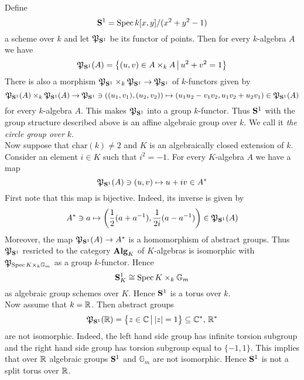 \begin{example}\label{example:non_split_torus}
Define
$$\mathbf{S}^1 = \mathrm{Spec}\, k[x,y]/(x^2+y^2-1)$$
a scheme over $k$ and let ${\mathfrak P}_{\mathbf{S}^1}$ be its functor of points. Then for every $k$-algebra $A$ we have
$${\mathfrak P}_{\mathbf{S}^1}(A) = \big\{(u,v)\in A\times_k A\,\big|\,u^2+v^2=1\big\}$$
There is also a morphism ${\mathfrak P}_{\mathbf{S}^1}\times_k {\mathfrak P}_{\mathbf{S}^1}\rightarrow {\mathfrak P}_{\mathbf{S}^1}$ of $k$-functors given by
$${\mathfrak P}_{\mathbf{S}^1}(A)\times_k {\mathfrak P}_{\mathbf{S}^1}(A)\rightarrow {\mathfrak P}_{\mathbf{S}^1}\ni \left((u_1,v_1),(u_2,v_2)\right)\mapsto (u_1u_2-v_1v_2,u_1v_2+u_2v_1)\in {\mathfrak P}_{\mathbf{S}^1}(A)$$
for every $k$-algebra $A$. This makes ${\mathfrak P}_{\mathbf{S}^1}$ into a group $k$-functor. Thus $\mathbf{S}^1$ with the group structure described above is an affine algebraic group over $k$. We call it \textit{the circle group over $k$}.\\
Now suppose that $\mathrm{char}(k) \neq 2$ and $K$ is an algebraically closed extension of $k$. Consider an element $i\in K$ such that $i^2 = -1$. For every $K$-algebra $A$ we have a map
$${\mathfrak P}_{\mathbf{S}^1}(A)\ni (u,v)\mapsto u+iv\in A^*$$
First note that this map is bijective. Indeed, its inverse is given by
$$A^*\ni a \mapsto \left(\frac{1}{2}(a+a^{-1}),\frac{1}{2i}(a-a^{-1})\right) \in {\mathfrak P}_{\mathbf{S}^1}(A)$$
Moreover, the map ${\mathfrak P}_{\mathbf{S}^1}(A)\rightarrow A^*$ is a homomorphism of abstract groups. Thus ${\mathfrak P}_{\mathbf{S}^1}$ resricted to the category $\mathbf{Alg}_K$ of $K$-algebras is isomorphic with ${\mathfrak P}_{\mathrm{Spec}\, K\times_k \mathbb{G}_{m}}$ as a group $k$-functor. Hence
$$\mathbf{S}^1_K \cong \mathrm{Spec}\, K\times_k \mathbb{G}_{m}$$
as algebraic group schemes over $K$. Hence $\mathbf{S}^1$ is a torus over $k$.\\
Now assume that $k = {\mathbb R}$. Then abstract groups
$${\mathfrak P}_{\mathbf{S}^1}({\mathbb R}) = \big\{z\in {\mathbb C}\,\big|\,|z|=1\big\} \subseteq {\mathbb C}^*,\,{\mathbb R}^*$$
are not isomorphic. Indeed, the left hand side group has infinite torsion subgroup and the right hand side group has torsion subgroup equal to $\{-1,1\}$. This implies that over ${\mathbb R}$ algebraic groups $\mathbf{S}^1$ and $\mathbb{G}_{m}$ are not isomorphic. Hence $\mathbf{S}^1$ is not a split torus over ${\mathbb R}$.
\end{example}

